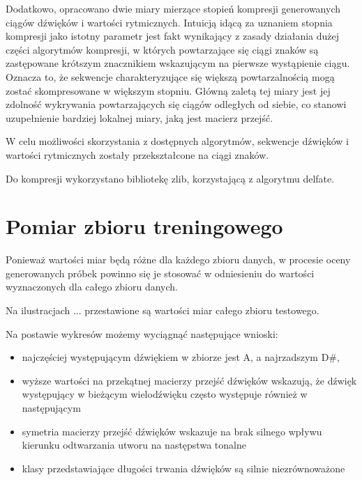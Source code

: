 {{        Dodatkowo, opracowano dwie miary mierzące stopień kompresji generowanych ciągów dźwięków i wartości rytmicznych. 
        Intuicją idącą za uznaniem stopnia kompresji jako istotny parametr jest fakt wynikający z zasady działania dużej części
        algorytmów kompresji, w których powtarzające się ciągi znaków są zastępowane krótszym znacznikiem wskazującym na pierwsze 
        wystąpienie ciągu. 
        Oznacza to, że sekwencje charakteryzujące się większą powtarzalnością mogą zostać skompresowane w większym stopniu.
        Główną zaletą tej miary jest jej zdolność wykrywania powtarzających się ciągów odległych od siebie, co stanowi uzupełnienie 
        bardziej lokalnej miary, jaką jest macierz przejść.

        W celu możliwości skorzystania z dostępnych algorytmów, sekwencje dźwięków i wartości rytmicznych zostały przekształcone
        na ciągi znaków.

        Do kompresji wykorzystano bibliotekę zlib, korzystającą z algorytmu delfate.
    }

    \section{Pomiar zbioru treningowego}
    {
        Ponieważ wartości miar będą różne dla każdego zbioru danych, w procesie oceny generowanych próbek powinno się je 
        stosować w odniesieniu do wartości wyznaczonych dla całego zbioru danych.
        
        Na ilustracjach ... przestawione są wartości miar całego zbioru testowego.






        Na postawie wykresów możemy wyciągnąć następujące wnioski:
        \begin{itemize}
            \item najczęściej występującym dźwiękiem w zbiorze jest A, a najrzadszym D\#,
            \item wyższe wartości na przekątnej macierzy przejść dźwięków wskazują, że dźwięk występujący w bieżącym wielodźwięku
            często występuje również w następującym
            \item symetria macierzy przejść dźwięków wskazuje na brak silnego wpływu kierunku odtwarzania utworu na następstwa tonalne
            \item klasy przedstawiające długości trwania dźwięków są silnie niezrównoważone
        \end{itemize}
    }

}
